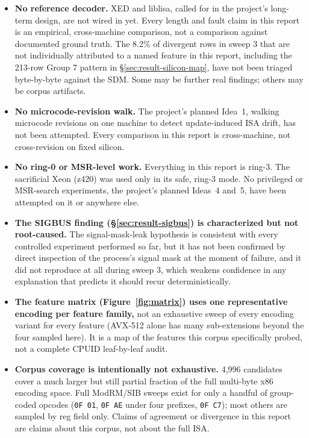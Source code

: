 \documentclass[11pt]{article}
\newcommand{\code}[1]{\texttt{#1}}
\begin{document}
\begin{itemize}
  \item \textbf{No reference decoder.} XED and liblisa, called for in
    the project's long-term design, are not wired in yet. Every length
    and fault claim in this report is an empirical, cross-machine
    comparison, not a comparison against documented ground truth. The
    8.2\% of divergent rows in sweep 3 that are not individually
    attributed to a named feature in this report, including the 213-row
    Group 7 pattern in \S\ref{sec:result-silicon-map}, have not been
    triaged byte-by-byte against the SDM. Some may be further real
    findings; others may be corpus artifacts.
  \item \textbf{No microcode-revision walk.} The project's planned
    Idea~1, walking microcode revisions on one machine to detect
    update-induced ISA drift, has not been attempted. Every comparison
    in this report is cross-machine, not cross-revision on fixed
    silicon.
  \item \textbf{No ring-0 or MSR-level work.} Everything in this report
    is ring-3. The sacrificial Xeon (z420) was used only in its safe,
    ring-3 mode. No privileged or MSR-search experiments, the project's
    planned Ideas~4 and~5, have been attempted on it or anywhere else.
  \item \textbf{The SIGBUS finding (\S\ref{sec:result-sigbus}) is
    characterized but not root-caused.} The signal-mask-leak hypothesis
    is consistent with every controlled experiment performed so far, but
    it has not been confirmed by direct inspection of the process's
    signal mask at the moment of failure, and it did not reproduce at
    all during sweep 3, which weakens confidence in any explanation that
    predicts it should recur deterministically.
  \item \textbf{The feature matrix (Figure~\ref{fig:matrix}) uses one
    representative encoding per feature family,} not an exhaustive sweep
    of every encoding variant for every feature (AVX-512 alone has many
    sub-extensions beyond the four sampled here). It is a map of the
    features this corpus specifically probed, not a complete CPUID
    leaf-by-leaf audit.
  \item \textbf{Corpus coverage is intentionally not exhaustive.} 4{,}996
    candidates cover a much larger but still partial fraction of the
    full multi-byte x86 encoding space. Full ModRM/SIB sweeps exist for
    only a handful of group-coded opcodes (\code{0F~01}, \code{0F~AE}
    under four prefixes, \code{0F~C7}); most others are sampled by reg
    field only. Claims of agreement or divergence in this report are
    claims about this corpus, not about the full ISA.
\end{itemize}
\end{document}
